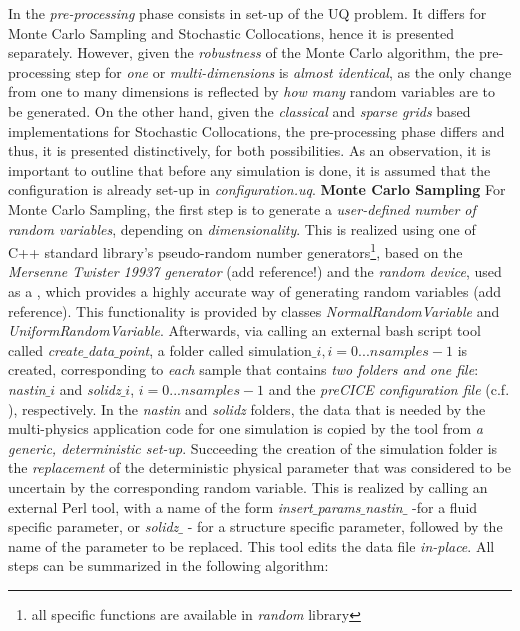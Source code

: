 	In the \emph{pre-processing} phase consists in set-up of the UQ problem. It differs for Monte Carlo Sampling and Stochastic Collocations, hence it is presented separately. However, given the \emph{robustness} of the Monte Carlo algorithm, the pre-processing step for \emph{one} or \emph{multi-dimensions} is \emph{almost identical}, as the only change from one to many dimensions is reflected by \emph{how many} random variables are to be generated. On the other hand, given the \emph{classical} and \emph{sparse grids} based implementations for Stochastic Collocations, the pre-processing phase differs and thus, it is presented distinctively, for both possibilities. As an observation, it is important to outline that before any simulation is done, it is assumed that the configuration is already set-up in \emph{configuration.uq}.
\newline
\textbf{Monte Carlo Sampling}
\newline
	For Monte Carlo Sampling, the first step is to generate a \emph{user-defined number of random variables}, depending on \emph{dimensionality}. This is realized using one of C++ standard library's pseudo-random number generators\footnote{all specific functions are available in \emph{random} library}, based on the \emph{Mersenne Twister 19937 generator} (add reference!) and the \emph{random device}, used as a , which provides a highly accurate way of generating random variables (add reference). This functionality is provided by classes \emph{NormalRandomVariable} and \emph{UniformRandomVariable}. Afterwards, via calling an external bash script tool called \emph{create$\_$data$\_$point}, a folder called simulation$\_i, i = 0...nsamples-1$ is created, corresponding to \emph{each} sample that contains \emph{two folders and one file}: \emph{nastin$\_i$} and \emph{solidz$\_i$}, $i = 0...nsamples-1$ and the \emph{preCICE configuration file} (c.f.  ), respectively. In the \emph{nastin} and \emph{solidz} folders, the data that is needed by the multi-physics application code for one simulation is copied by the tool from \emph{a generic, deterministic set-up}. Succeeding the creation of the simulation folder is the \emph{replacement} of the deterministic physical parameter that was considered to be uncertain by the corresponding random variable. This is realized by calling an external Perl tool, with a name of the form \emph{insert$\_$params$\_$nastin$\_$} -for a fluid specific parameter, or \emph{solidz$\_$} - for a structure specific parameter, followed by the name of the parameter to be replaced. This tool edits the data file \emph{in-place}. All steps can be summarized in the following algorithm:
